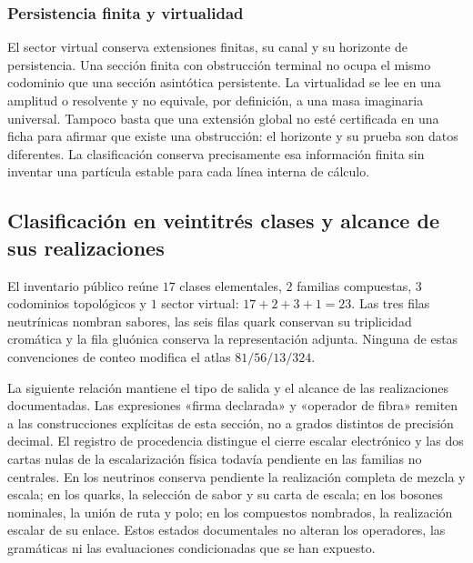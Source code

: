 \subsubsection{Persistencia finita y virtualidad}

El sector virtual conserva extensiones finitas, su canal y su horizonte
de persistencia. Una sección finita con obstrucción terminal no ocupa
el mismo codominio que una sección asintótica persistente. La
virtualidad se lee en una amplitud o resolvente y no equivale, por
definición, a una masa imaginaria universal. Tampoco basta que una
extensión global no esté certificada en una ficha para afirmar que
existe una obstrucción: el horizonte y su prueba son datos diferentes.
La clasificación conserva precisamente esa información finita sin
inventar una partícula estable para cada línea interna de cálculo.

\subsection{Clasificación en veintitrés clases y alcance de sus realizaciones}
\label{vi:vi:subsec:23-clases}

El inventario público reúne \(17\) clases elementales, \(2\) familias
compuestas, \(3\) codominios topológicos y \(1\) sector virtual:
\(17+2+3+1=23\). Las tres filas neutrínicas nombran sabores, las
seis filas quark conservan su triplicidad cromática y la fila gluónica
conserva la representación adjunta. Ninguna de estas convenciones de
conteo modifica el atlas \(81/56/13/324\).

La siguiente relación mantiene el tipo de salida y el alcance de las
realizaciones documentadas. Las expresiones «firma declarada» y
«operador de fibra» remiten a las construcciones explícitas de esta
sección, no a grados distintos de precisión decimal.
El registro de procedencia distingue el cierre escalar electrónico y
las dos cartas nulas de la escalarización física todavía pendiente en
las familias no centrales. En los neutrinos conserva pendiente la
realización completa de mezcla y escala; en los quarks, la selección de
sabor y su carta de escala; en los bosones nominales, la unión de ruta
y polo; en los compuestos nombrados, la realización escalar de su
enlace. Estos estados documentales no alteran los operadores, las
gramáticas ni las evaluaciones condicionadas que se han expuesto.

